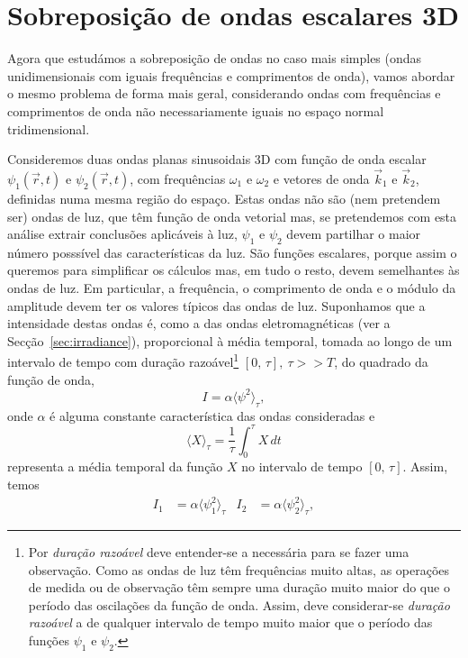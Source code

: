 \section{Sobreposição de ondas escalares 3D}\label{sec:scalarsuperp}
Agora que estudámos a sobreposição de ondas no caso mais simples (ondas
unidimensionais com iguais frequências e comprimentos de onda), vamos abordar o
mesmo problema de forma mais geral, considerando ondas com frequências e
comprimentos de onda não necessariamente iguais no espaço normal tridimensional.

Consideremos duas ondas planas sinusoidais 3D com função de onda escalar
$\psi_1(\vec r,t)$ e $\psi_2(\vec r,t)$, com frequências $\omega_1$ e $\omega_2$
e vetores de onda $\vec k_1$ e $\vec k_2$, definidas numa mesma região do
espaço.  Estas ondas não são (nem pretendem ser) ondas de luz, que têm função de
onda vetorial mas, se pretendemos com esta análise extrair conclusões aplicáveis
à luz, $\psi_1$ e $\psi_2$ devem partilhar o maior número posssível das
características da luz. São funções escalares, porque assim o queremos para
simplificar os cálculos mas, em tudo o resto, devem semelhantes às ondas de luz.
Em particular, a frequência, o comprimento de onda e o módulo da amplitude devem
ter os valores típicos das ondas de luz. Suponhamos que a intensidade destas
ondas é, como a das ondas eletromagnéticas (ver a Secção~\ref{sec:irradiance}),
proporcional à média temporal, tomada ao longo de um intervalo de tempo com
duração razoável\footnote{Por \emph{duração razoável} deve entender-se a
necessária para se fazer uma observação. Como as ondas de luz têm frequências
muito altas, as operações de medida ou de observação têm sempre uma duração
muito maior do que o período das oscilações da função de onda.  Assim, deve
considerar-se \emph{duração razoável} a de qualquer intervalo de tempo muito
maior que o período das funções $\psi_1$ e $\psi_2$.} $[0,\,\tau],\ \tau>>T$, do
quadrado da função de onda,
\begin{equation*}
I=\alpha \langle \psi^2\rangle_\tau,
\end{equation*}
onde $\alpha$ é alguma constante característica das ondas consideradas e
\begin{equation*}
\langle X\rangle_\tau =\frac{1}{\tau}\int_0^\tau X\,dt
\end{equation*}
representa a média temporal da função $X$ no intervalo de tempo $[0,\,\tau]$.
Assim, temos
\begin{align*}
I_1&=\alpha\langle\psi_1^2\rangle_\tau&
I_2&=\alpha\langle\psi_2^2\rangle_\tau,
\end{align*}
